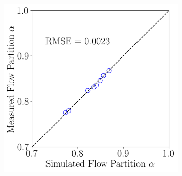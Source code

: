 \documentclass[preview, border=2pt]{standalone}
\begin{document}
\begin{figure}
\begin{subfigure}[b]{0.32\textwidth}
     \end{subfigure}
     \hfill     
     \begin{subfigure}[b]{0.32\textwidth}
         \centering
         \caption{}
         \includegraphics[width=\textwidth]{calibration_results_ManningN_flow_partition.png}
     \end{subfigure}
\end{figure}
\end{document}
